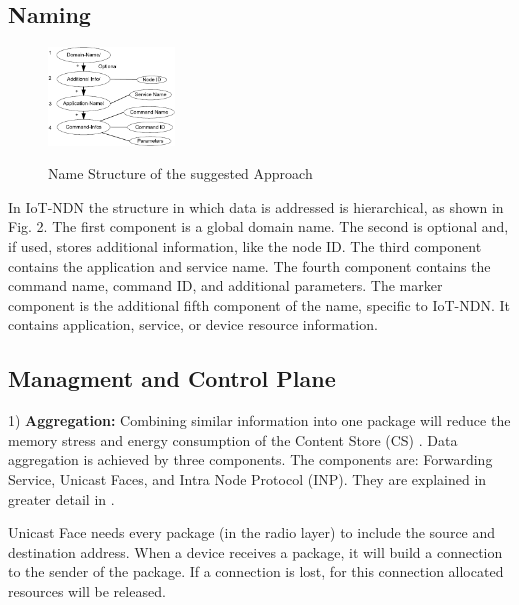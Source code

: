 \documentclass[conference]{IEEEtran}
\begin{document}
  \subsection{Naming}
  \begin{figure}[h]
      \centering
      \includegraphics[width=0.3\textwidth]{Name_Structure_of_the_suggested_Approach.png}\\
      \caption{Name Structure of the suggested Approach}
      \label{fig:enter-label}
  \end{figure}
  
  In IoT-NDN the structure in which data is addressed is hierarchical, as shown in Fig. 2.
  The first component is a global domain name. 
  The second is optional and, if used, stores additional information, like the node ID.
  The third component contains the application and service name.
  The fourth component contains the command name, command ID, and additional parameters.
  The marker component is the additional fifth component of the name, specific to IoT-NDN.
  It contains application, service, or device resource information.
  
  \subsection{Managment and Control Plane}
  1) \textbf{Aggregation:} Combining similar information into one package will reduce the memory stress and energy consumption of the Content Store (CS) \cite{b5}.
  Data aggregation is achieved by three components. The components are: Forwarding Service, Unicast Faces, and Intra Node Protocol (INP). They are explained in greater detail in \cite{b5}.
  
  Unicast Face needs every package (in the radio layer) to include the source and destination address. 
  When a device receives a package, it will build a connection to the sender of the package. 
  If a connection is lost, for this connection allocated resources will be released. 
  
\end{document}
